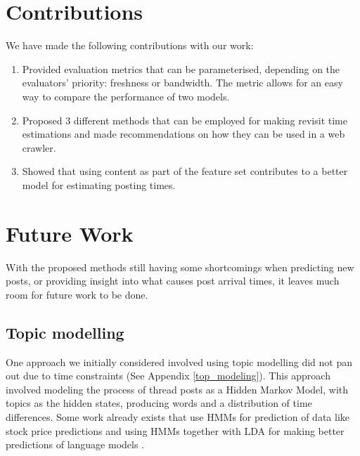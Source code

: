 \section{Contributions}
We have made the following contributions with our work:
\begin{enumerate}
\item Provided evaluation metrics that can be parameterised, depending on the 
	evaluators' priority: freshness or bandwidth. The metric allows for an easy 
	way to compare the performance of two models.
\item Proposed 3 different methods that can be employed for making revisit time 
	estimations and made recommendations on how they can be used in a web 
	crawler.
\item Showed that using content as part of the feature set contributes to a 
	better model for estimating posting times.
\end{enumerate}

\section{Future Work}

With the proposed methods still having some shortcomings when predicting new 
posts, or providing insight into what causes post arrival times, it leaves much 
room for future work to be done.



\subsection{Topic modelling}
One approach we initially considered involved using topic modelling did not pan 
out due to time constraints (See Appendix \ref{top_modeling}). This approach 
involved modeling the process of thread posts as a Hidden Markov Model, with 
topics as the hidden states, producing words and a distribution of time 
differences. Some work already exists that use HMMs for prediction of data like 
stock price predictions \cite{Gonzalez2005} and using HMMs together with LDA for 
making better predictions of language models \cite{Hsu2006}.

